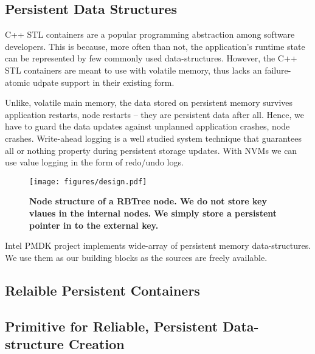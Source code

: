 \subsection{Persistent Data Structures}

C++ STL containers are a popular programming abstraction among software developers. This is because,
more often than not, the application's runtime state can be represented by few commonly used 
data-structures.  However, the C++ STL containers are meant to use with volatile memory, thus
lacks an failure-atomic udpate support in their existing form.

Unlike, volatile main memory, the data stored on persistent memory survives application restarts,
node restarts -- they are persistent data after all. Hence, we have to guard the data updates 
against unplanned application crashes, node crashes. Write-ahead logging is a well studied
system technique that guarantees all or nothing property during persistent storage updates.
With NVMs we can use value logging in the form of redo/undo logs.

\begin{figure}[]   
	\centering
	\texttt{[image: figures/design.pdf]} 
	\caption{\bf Node structure of a RBTree node. We do not store key vlaues in the internal nodes. We simply
	store a persistent pointer in to the external key.} 
	\label{fig:zerocopy} 
\end{figure}

Intel PMDK project implements wide-array of persistent memory data-structures. 
We use them as our building blocks as the sources are freely available. 

\subsection{Relaible Persistent Containers}







\subsection{Primitive for Reliable, Persistent Data-structure Creation}

